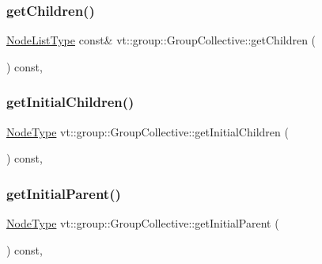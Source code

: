 \subsubsection{\texorpdfstring{get\+Children()}{getChildren()}}
{\footnotesize\ttfamily \hyperlink{structvt_1_1group_1_1_group_collective_a24ad1fd43cf03d5026de910d85c7ac96}{Node\+List\+Type} const\& vt\+::group\+::\+Group\+Collective\+::get\+Children (\begin{DoxyParamCaption}{ }\end{DoxyParamCaption}) const\hspace{0.3cm}{\ttfamily [inline]}, {\ttfamily [protected]}}

\mbox{\label{structvt_1_1group_1_1_group_collective_a6687873bb6e1cdb738fa037d415c2873}} 
\subsubsection{\texorpdfstring{get\+Initial\+Children()}{getInitialChildren()}}
{\footnotesize\ttfamily \hyperlink{namespacevt_a866da9d0efc19c0a1ce79e9e492f47e2}{Node\+Type} vt\+::group\+::\+Group\+Collective\+::get\+Initial\+Children (\begin{DoxyParamCaption}{ }\end{DoxyParamCaption}) const\hspace{0.3cm}{\ttfamily [inline]}, {\ttfamily [protected]}}

\mbox{\label{structvt_1_1group_1_1_group_collective_ac8af818af1d4d5c340690bafcdd733d6}} 
\subsubsection{\texorpdfstring{get\+Initial\+Parent()}{getInitialParent()}}
{\footnotesize\ttfamily \hyperlink{namespacevt_a866da9d0efc19c0a1ce79e9e492f47e2}{Node\+Type} vt\+::group\+::\+Group\+Collective\+::get\+Initial\+Parent (\begin{DoxyParamCaption}{ }\end{DoxyParamCaption}) const\hspace{0.3cm}{\ttfamily [inline]}, {\ttfamily [protected]}}

